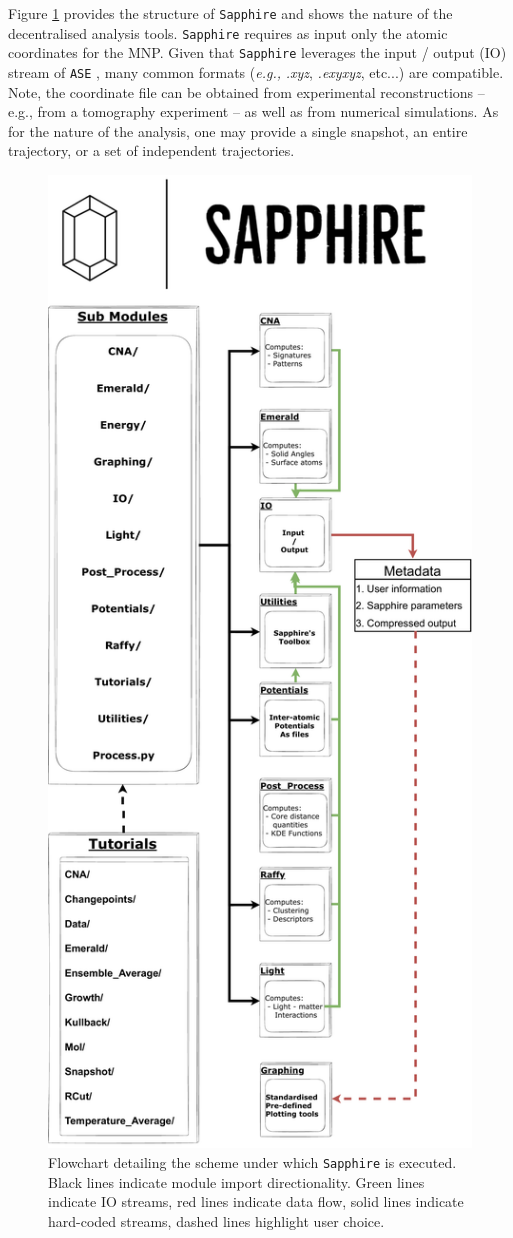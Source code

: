 Figure \ref{Sapphire_Workflow}  provides the structure of \texttt{Sapphire} and shows the nature of the decentralised analysis tools. 
%
\texttt{Sapphire} requires as input only the atomic coordinates for the MNP. 
Given that \texttt{Sapphire} leverages the input / output (IO) stream of \texttt{ASE} \cite{ase-paper}, many common formats (\textit{e.g.,} \textit{ .xyz}, \textit{ .exyxyz}, etc...) are compatible. 
%
Note, the coordinate file can be obtained from experimental reconstructions -- e.g., from a tomography experiment -- as well as from numerical simulations. 
As for the nature of the analysis, one may provide a single snapshot, an entire trajectory, or a set of independent trajectories.
%

\begin{figure}[t!]
    \centering
    \includegraphics[width=8 cm]{figures/Sapphire/Workflow.pdf}\hfill
\caption{Flowchart detailing the scheme under which \texttt{Sapphire} is executed. Black lines indicate module import directionality. Green lines indicate IO streams, red lines indicate data flow, solid lines indicate hard-coded streams, dashed  lines highlight user choice.}
\label{Sapphire_Workflow}
\end{figure}
%

